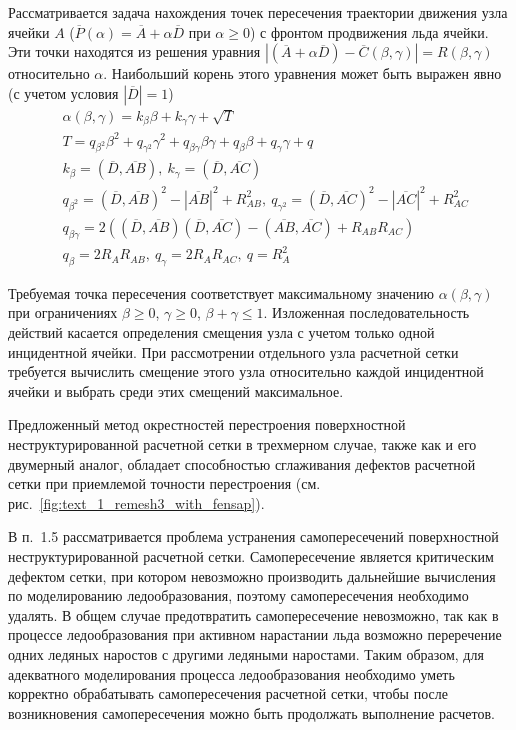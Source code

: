 \documentclass[a4paper,14pt]{extarticle}                     %
\theoremstyle{plain}                                         %
\begin{document}
Рассматривается задача нахождения точек пересечения траектории движения узла ячейки $A$ ($\overline{P}(\alpha) = \overline{A} + \alpha \overline{D}$ при $\alpha \ge 0$) с фронтом продвижения льда ячейки.
Эти точки находятся из решения уравния $|(\overline{A} + \alpha \overline{D}) - \overline{C}(\beta, \gamma)| = R(\beta, \gamma)$ относительно $\alpha$.
Наибольший корень этого уравнения может быть выражен явно (с учетом условия $|\overline{D}| = 1$)
\begin{equation}
	\begin{aligned}
		& \alpha(\beta, \gamma) = k_{\beta} \beta + k_{\gamma} \gamma + \sqrt{T} \\
		& T = q_{\beta^2} \beta^2 + q_{\gamma^2} \gamma^2 + q_{\beta \gamma} \beta \gamma + q_{\beta} \beta + q_{\gamma} \gamma + q \\
		& k_{\beta} = (\overline{D}, \overline{AB}), \ k_{\gamma} = (\overline{D}, \overline{AC}) \\
		& q_{\beta^2} = (\overline{D}, \overline{AB})^2 - |\overline{AB}|^2 + R_{AB}^2, \ q_{\gamma^2} = (\overline{D}, \overline{AC})^2 - |\overline{AC}|^2 + R_{AC}^2 \\
		& q_{\beta \gamma} = 2 \left( (\overline{D}, \overline{AB}) (\overline{D}, \overline{AC}) - (\overline{AB}, \overline{AC}) + R_{AB}R_{AC} \right) \\
		& q_{\beta} = 2 R_A R_{AB}, \ q_{\gamma} = 2 R_A R_{AC}, \ q = R_A^2
	\end{aligned}
\end{equation}

Требуемая точка пересечения соответствует максимальному значению $\alpha(\beta, \gamma)$ при ограничениях $\beta \ge 0$, $\gamma \ge 0$, $\beta + \gamma \le 1$.
Изложенная последовательность действий касается определения смещения узла с учетом только одной инцидентной ячейки.
При рассмотрении отдельного узла расчетной сетки требуется вычислить смещение этого узла относительно каждой инцидентной ячейки и выбрать среди этих смещений максимальное.

Предложенный метод окрестностей перестроения поверхностной неструктурированной расчетной сетки в трехмерном случае, также как и его двумерный аналог, обладает способностью сглаживания дефектов расчетной сетки при приемлемой точности перестроения (см. рис.~\ref{fig:text_1_remesh3_with_fensap}).


В п.~1.5 рассматривается проблема устранения самопересечений поверхностной неструктурированной расчетной сетки.
Самопересечение является критическим дефектом сетки, при котором невозможно производить дальнейшие вычисления по моделированию ледообразования, поэтому самопересечения необходимо удалять.
В общем случае предотвратить самопересечение невозможно, так как в процессе ледообразования при активном нарастании льда возможно переречение одних ледяных наростов с другими ледяными наростами.
Таким образом, для адекватного моделирования процесса ледообразования необходимо уметь корректно обрабатывать самопересечения расчетной сетки, чтобы после возникновения самопересечения можно быть продолжать выполнение расчетов.
\end{document}
